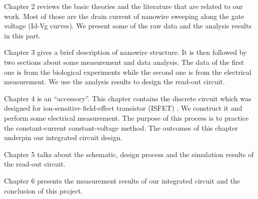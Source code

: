 Chapter 2 reviews the basic theories and the literature that are related to our work.
Most of those are the drain current of nanowire sweeping along the gate voltage (Id-Vg curves).
We present some of the raw data and the analysis results in this part.

Chapter 3 gives a brief description of nanowire structure.
It is then followed by two sections about some measurement and data analysis.
The data of the first one is from the biological experiments while the second one is from the electrical measurement.
We use the analysis results to design the read-out circuit.

Chapter 4 is an ``accessory''.
This chapter contains the discrete circuit which was designed for ion-sensitive field-effect transistor (ISFET) \cite{SF1}.
We construct it and perform some electrical measurement.
The purpose of this process is to practice the constant-current constant-voltage method.
The outcomes of this chapter underpin our integrated circuit design.

Chapter 5 talks about the schematic, design process and the simulation results of the read-out circuit.

Chapter 6 presents the measurement results of our integrated circuit and the conclusion of this project.








%
%
%
%

%
%




